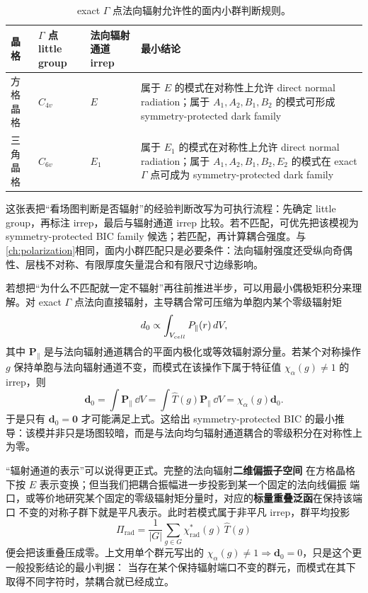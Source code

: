 \begin{table}[htbp]
  \centering
  \footnotesize
  \caption{exact $\Gamma$ 点法向辐射允许性的面内小群判断规则。}
  \label{tab:gamma-rad-irrep}
  \setlength{\tabcolsep}{4pt}
  \begin{tabularx}{\textwidth}{@{}p{1.8cm}p{1.8cm}p{2.4cm}Y@{}}
    \toprule
    晶格 & $\Gamma$ 点 little group & 法向辐射通道 irrep & 最小结论 \\
    \midrule
    方格晶格 & $C_{4v}$ & $E$ & 属于 $E$ 的模式在对称性上允许 direct normal radiation；属于 $A_1,A_2,B_1,B_2$ 的模式可形成 symmetry-protected dark family \\
    三角晶格 & $C_{6v}$ & $E_1$ & 属于 $E_1$ 的模式在对称性上允许 direct normal radiation；属于 $A_1,A_2,B_1,B_2,E_2$ 的模式在 exact $\Gamma$ 点可成为 symmetry-protected dark family \\
    \bottomrule
  \end{tabularx}
\end{table}

这张表把“看场图判断是否辐射”的经验判断改写为可执行流程：先确定 little group，再标注 irrep，最后与辐射通道 irrep 比较。若不匹配，可优先把该模视为 symmetry-protected BIC family 候选；若匹配，再计算耦合强度。与\cref{ch:polarization}相同，面内小群匹配只是必要条件：法向辐射强度还受纵向奇偶性、层栈不对称、有限厚度矢量混合和有限尺寸边缘影响。

若想把“为什么不匹配就一定不辐射”再往前推进半步，可以用最小偶极矩积分来理解。对 exact $\Gamma$ 点法向直接辐射，主导耦合常可压缩为单胞内某个零级辐射矩
\begin{equation}
d_0 \propto \int_{V_{cell}}P_{\parallel}(r)\,d V,
\label{eq:gamma_dipole_integral}
\end{equation}
其中 $\bm{P}_{\parallel}$ 是与法向辐射通道耦合的平面内极化或等效辐射源分量。若某个对称操作 $g$ 保持单胞与法向辐射通道不变，而模式在该操作下属于特征值 $\chi_\alpha(g)\neq 1$ 的 irrep，则
\[
\bm d_0
=
\int \bm P_{\parallel}\,\dd V
=
\int \hat T(g)\bm P_{\parallel}\,\dd V
=
\chi_\alpha(g)\bm d_0.
\]
于是只有 $\bm d_0=\bm 0$ 才可能满足上式。这给出 symmetry-protected BIC 的最小推导：该模并非只是场图较暗，而是与法向均匀辐射通道耦合的零级积分在对称性上为零。

“辐射通道的表示”可以说得更正式。完整的法向辐射\textbf{二维偏振子空间}
在方格晶格下按 $E$ 表示变换；但当我们把耦合振幅进一步投影到某一个固定的法向线偏振
端口，或等价地研究某个固定的零级辐射矩分量时，对应的\textbf{标量重叠泛函}在保持该端口
不变的对称子群下就是平凡表示。此时若模式属于非平凡 irrep，群平均投影
\begin{equation}
\Pi_{\mathrm{rad}} =
\frac{1}{|G|}\sum_{g\in G}\chi_{\mathrm{rad}}^\ast(g)\,\hat T(g)
\label{eq:bic_group_projector}
\end{equation}
便会把该重叠压成零。上文用单个群元写出的
$\chi_\alpha(g)\neq 1\Rightarrow \bm d_0=0$，只是这个更一般投影结论的最小判据：
当存在某个保持辐射端口不变的群元，而模式在其下取得不同字符时，禁耦合就已经成立。

